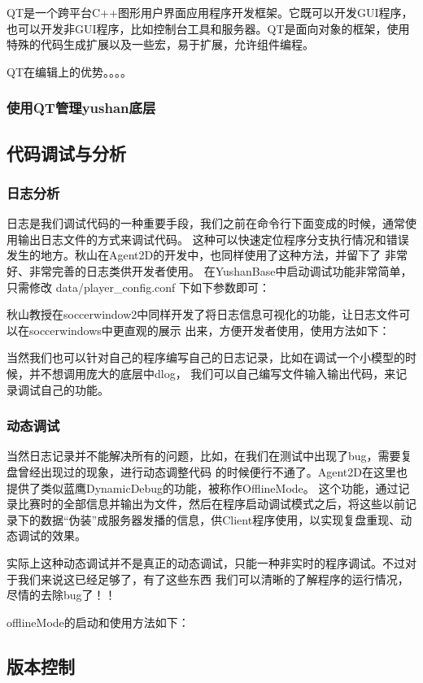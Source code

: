 QT是一个跨平台C++图形用户界面应用程序开发框架。它既可以开发GUI程序，也可以开发非GUI程序，比如控制台工具和服务器。QT是面向对象的框架，使用特殊的代码生成扩展以及一些宏，易于扩展，允许组件编程。

QT在编辑上的优势。。。。
\subsubsection{使用QT管理yushan底层}

\subsection{代码调试与分析}

\subsubsection{日志分析}
日志是我们调试代码的一种重要手段，我们之前在命令行下面变成的时候，通常使用输出日志文件的方式来调试代码。
这种可以快速定位程序分支执行情况和错误发生的地方。秋山在Agent2D的开发中，也同样使用了这种方法，并留下了
非常好、非常完善的日志类供开发者使用。
在YushanBase中启动调试功能非常简单，只需修改 data/player_config.conf 下如下参数即可：

秋山教授在soccerwindow2中同样开发了将日志信息可视化的功能，让日志文件可以在soccerwindows中更直观的展示
出来，方便开发者使用，使用方法如下：

当然我们也可以针对自己的程序编写自己的日志记录，比如在调试一个小模型的时候，并不想调用庞大的底层中dlog，
我们可以自己编写文件输入输出代码，来记录调试自己的功能。
\subsubsection{动态调试}
当然日志记录并不能解决所有的问题，比如，在我们在测试中出现了bug，需要复盘曾经出现过的现象，进行动态调整代码
的时候便行不通了。Agent2D在这里也提供了类似蓝鹰DynamicDebug的功能，被称作OfflineMode。
这个功能，通过记录比赛时的全部信息并输出为文件，然后在程序启动调试模式之后，将这些以前记录下的数据“伪装”成服务器发播的信息，供Client程序使用，以实现复盘重现、动态调试的效果。

实际上这种动态调试并不是真正的动态调试，只能一种非实时的程序调试。不过对于我们来说这已经足够了，有了这些东西
我们可以清晰的了解程序的运行情况，尽情的去除bug了！！

offlineMode的启动和使用方法如下：
\subsection{版本控制}

